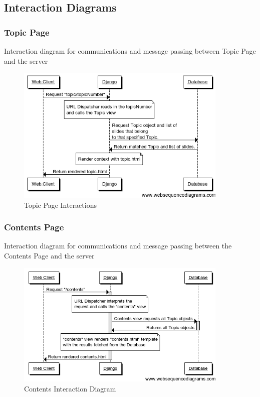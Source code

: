 \documentclass{l3proj}
\begin{document}
\subsection{Interaction Diagrams}
\subsubsection{Topic Page}
Interaction diagram for communications and message passing between Topic Page and the server
\begin{figure}[!htb]
\caption{Topic Page Interactions}
 \centering
\includegraphics[width=0.9\textwidth]{images/topicPageMessagePassing.png}
\end{figure}

\subsubsection{Contents Page}
Interaction diagram for communications and message passing between the Contents Page and the server
\begin{figure}[!htb]
\caption{Contents Interaction Diagram}
 \centering
\includegraphics[width=0.9\textwidth]{images/contentsInteractionDiagram.png}
\end{figure}
\end{document}
